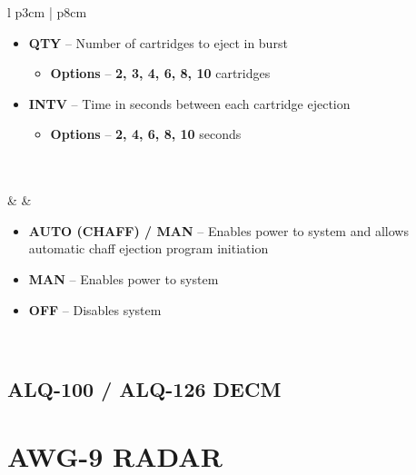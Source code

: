 \documentclass[8pt,usenames,dvipsnames,twoside]{article}
\begin{document}
\begin{center}
\begin{longtable}{l p{3cm} | p{8cm}}
\begin{minipage}[t]{\linewidth}
				\vspace{-7pt}
				\begin{itemize}
					\item \textbf{QTY} -- Number of cartridges to eject in burst
					\begin{itemize}
						\item \textbf{Options} -- \textbf{2, 3, 4, 6, 8, 10} cartridges
					\end{itemize}
					\item \textbf{INTV} -- Time in seconds between each cartridge ejection
					\begin{itemize}
						\item \textbf{Options} -- \textbf{2, 4, 6, 8, 10} seconds
					\end{itemize}
				\end{itemize}
			\end{minipage} \\
			\midrule
			 \\
			\midrule
			\textbullet &   &
			\begin{minipage}[t]{\linewidth}
				\vspace{-7pt}
				\begin{itemize}
					\item \textbf{AUTO (CHAFF) / MAN} -- Enables power to system and allows automatic chaff ejection program initiation
					\item \textbf{MAN} -- Enables power to system
					\item \textbf{OFF} -- Disables system
				\end{itemize}
			\end{minipage} \\
			\bottomrule
		\end{longtable}
	\end{center}

	\subsection{ALQ-100 / ALQ-126 DECM}

	\cleardoublepage

	\section{AWG-9 RADAR}
\end{document}
